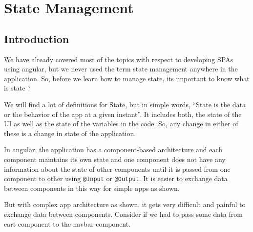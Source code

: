 \documentclass{report}
\begin{document}
\chapter{State Management}
\section{Introduction}
We have already covered most of the topics with respect to developing SPAs using angular, but we never used the term state management anywhere in the application. So, before we learn how to manage state, its important to know what is state ?

We will find a lot of definitions for State,  but in simple words, “State is the data or the behavior of the app at a given instant”. It includes both, the state of the UI as well as the state of the variables in the code. So, any change in either of these is a change in state of the application.

In angular, the application has a component-based architecture and each component maintains its own state and one component does not have any information about the state of other components until it is passed from one component to other using \lstinline{@Input} or \lstinline{@Output}. It is easier to exchange data between components in this way for simple apps as shown.

But with complex app architecture as shown, it gets very difficult and painful to exchange data between components. Consider if we had to pass some data from cart component to the navbar component.

\end{document}
